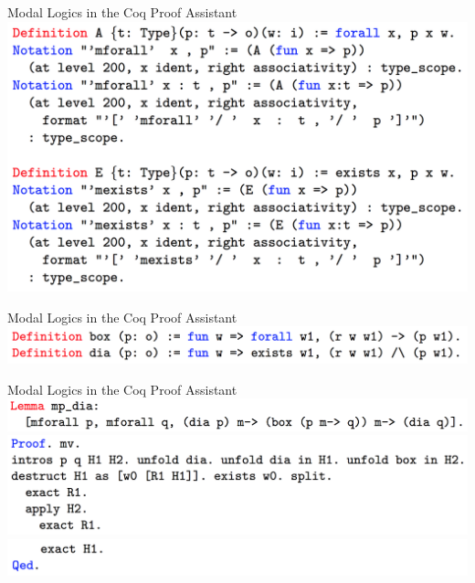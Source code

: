 \begin{frame}{Modal Logics in the Coq Proof Assistant}
\includegraphics[width=\textwidth]{Images/CoqCode/4.png}
\end{frame}

\begin{frame}{Modal Logics in the Coq Proof Assistant}
\includegraphics[width=\textwidth]{Images/CoqCode/5.png}\\
\end{frame}



\begin{frame}{Modal Logics in the Coq Proof Assistant}
\includegraphics[width=\textwidth]{Images/CoqCode/10.png}\\
\includegraphics[width=\textwidth]{Images/CoqCode/11.png}\\
\includegraphics[width=\textwidth]{Images/CoqCode/12.png}
\end{frame}


